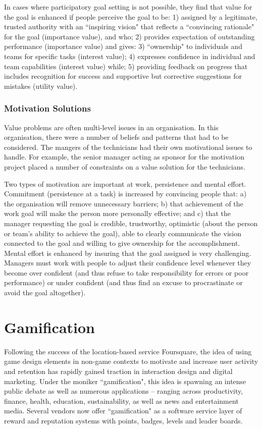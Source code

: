 In cases where participatory goal setting is not possible, they find that value for the goal is enhanced if people perceive the goal to be: 1) assigned by a legitimate, trusted authority with an ``inspiring vision" that reflects a ``convincing rationale" for the goal (importance value), and who; 2) provides expectation of outstanding performance (importance value) and gives: 3) ``ownership" to individuals and teams for specific tasks (interest value); 4) expresses confidence in individual and team capabilities (interest value) while; 5) providing feedback on progress that includes recognition for success and supportive but corrective suggestions for mistakes (utility value).

\subsubsection{Motivation Solutions}

Value problems are often multi-level issues in an organisation. In this organisation, there were a number of beliefs and patterns that had to be considered. The mangers of the technicians had their own motivational issues to handle. For example, the senior manager acting as sponsor for the motivation project placed a number of constraints on a value solution for the technicians.

Two types of motivation are important at work, persistence and mental effort. Commitment (persistence at a task) is increased by convincing people that: a) the organisation will remove unnecessary barriers; b) that achievement of the work goal will make the person more personally effective; and c) that the manager requesting the goal is credible, trustworthy, optimistic (about the person or team’s ability to achieve the goal), able to clearly communicate the vision connected to the goal and willing to give ownership for the accomplishment. Mental effort is enhanced by insuring that the goal assigned is very challenging. Managers must work with people to adjust their confidence level whenever they become over confident (and thus refuse to take responsibility for errors or poor performance) or under confident (and thus find an excuse to procrastinate or avoid the goal altogether).

\section{Gamification}

Following the success of the location-based service Foursquare, the idea of using game design elements in non-game contexts to motivate and increase user activity and retention has rapidly gained traction in interaction design and digital marketing. Under the moniker ``gamification", this idea is spawning an intense public debate as well as numerous applications – ranging across productivity, finance, health, education, sustainability, as well as news and entertainment media. Several vendors now offer ``gamification" as a software service layer of reward and reputation systems with points, badges, levels and leader boards.

